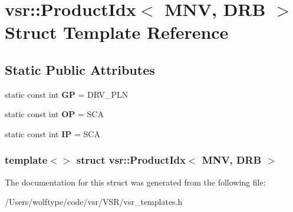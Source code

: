 \hypertarget{structvsr_1_1_product_idx_3_01_m_n_v_00_01_d_r_b_01_4}{\section{vsr\-:\-:Product\-Idx$<$ M\-N\-V, D\-R\-B $>$ Struct Template Reference}
\label{structvsr_1_1_product_idx_3_01_m_n_v_00_01_d_r_b_01_4}
}
\subsection*{Static Public Attributes}
\begin{DoxyCompactItemize}
\item 
\hypertarget{structvsr_1_1_product_idx_3_01_m_n_v_00_01_d_r_b_01_4_add62b1a0ee9ebdc0e83a60f8100c1857}{static const int {\bfseries G\-P} = D\-R\-V\-\_\-\-P\-L\-N}\label{structvsr_1_1_product_idx_3_01_m_n_v_00_01_d_r_b_01_4_add62b1a0ee9ebdc0e83a60f8100c1857}

\item 
\hypertarget{structvsr_1_1_product_idx_3_01_m_n_v_00_01_d_r_b_01_4_a0f89fbffb0b241440b3a4cc12f8d70ca}{static const int {\bfseries O\-P} = S\-C\-A}\label{structvsr_1_1_product_idx_3_01_m_n_v_00_01_d_r_b_01_4_a0f89fbffb0b241440b3a4cc12f8d70ca}

\item 
\hypertarget{structvsr_1_1_product_idx_3_01_m_n_v_00_01_d_r_b_01_4_a65b19f1231c4d51898870a90d6e2e24a}{static const int {\bfseries I\-P} = S\-C\-A}\label{structvsr_1_1_product_idx_3_01_m_n_v_00_01_d_r_b_01_4_a65b19f1231c4d51898870a90d6e2e24a}

\end{DoxyCompactItemize}
\subsubsection*{template$<$$>$ struct vsr\-::\-Product\-Idx$<$ M\-N\-V, D\-R\-B $>$}



The documentation for this struct was generated from the following file\-:\begin{DoxyCompactItemize}
\item 
/\-Users/wolftype/code/vsr/\-V\-S\-R/vsr\-\_\-templates.\-h\end{DoxyCompactItemize}
